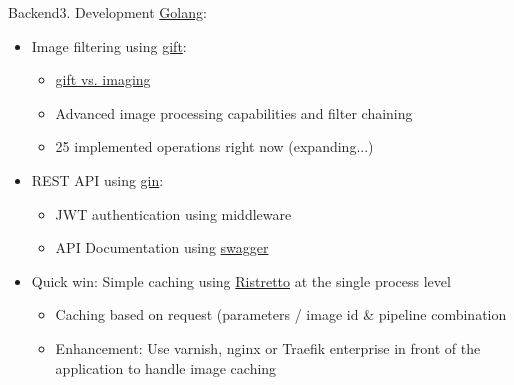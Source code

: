 \documentclass[aspectratio=169,20pt]{beamer}
\begin{document}
\begin{frame}{Backend}{3. Development}
	\underline{Golang}:
	\begin{itemize}
		\item{Image filtering using \href{https://github.com/disintegration/gift}{gift}:}
		\begin{itemize}
			\item{\href{https://github.com/disintegration/imaging\#whats-the-difference-between-imaging-and-gift-packages}{gift vs. imaging}}
			\item{Advanced image processing capabilities and filter chaining}
			\item{25 implemented operations right now (expanding...)}
		\end{itemize}
		\item{REST API using \href{https://github.com/gin-gonic/gin}{gin}:}
		\begin{itemize}
			\item{JWT authentication using middleware}
			\item{API Documentation using \href{https://github.com/swaggo/swag}{swagger}}
		\end{itemize}
		\item{Quick win: Simple caching using \href{https://github.com/dgraph-io/ristretto}{Ristretto} at the single process level}
		\begin{itemize}
			\item{Caching based on request (parameters / image id \& pipeline combination}
			\item{Enhancement: Use varnish, nginx or Traefik enterprise in front of the application to handle image caching}
		\end{itemize}
	\end{itemize}
\end{frame}
\end{document}
